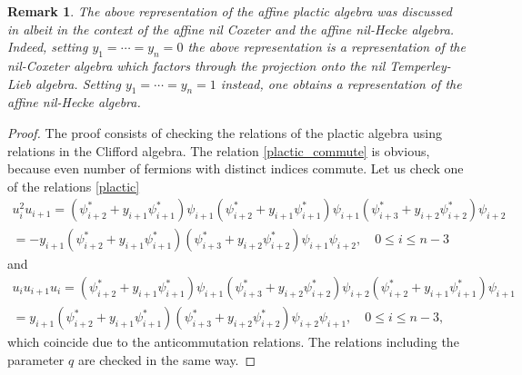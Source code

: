 \documentclass[12pt]{amsart}
\newtheorem{remark}{Remark}[section]
\numberwithin{equation}{section}
\numberwithin{figure}{section}
\begin{document}
    \begin{remark}\rm
        The above representation of the affine plactic algebra was discussed in \cite[Corollary 3.25 and Remark 3.26]{gorbounovkorff2014} albeit in the context of the affine nil Coxeter and the affine nil-Hecke algebra. Indeed, setting $y_1=\cdots=y_n=0$ the above representation is a representation of the nil-Coxeter algebra which factors through the projection onto the nil Temperley-Lieb algebra. Setting $y_1=\cdots=y_n=1$ instead, one obtains a representation of the affine nil-Hecke algebra.
    \end{remark}
    \begin{proof}
        The proof consists of checking the relations of the plactic algebra using relations in the Clifford algebra. The relation \eqref{plactic_commute} is obvious, because even number of fermions with distinct indices commute. Let us check one of the relations \eqref{plactic}
        \begin{gather*}
        u_i^2 u_{i + 1} = (\psi^*_{i + 2} + y_{i + 1} \psi^*_{i + 1}) \psi_{i + 1} (\psi^*_{i + 2} + y_{i + 1} \psi^*_{i + 1}) \psi_{i + 1} (\psi^*_{i + 3} + y_{i + 2} \psi^*_{i + 2}) \psi_{i + 2} \\
        = - y_{i + 1} (\psi^*_{i + 2} + y_{i + 1} \psi^*_{i + 1})(\psi^*_{i + 3} + y_{i + 2} \psi^*_{i + 2})\psi_{i + 1} \psi_{i + 2}, \quad 0 \leq i \leq n - 3 
        \end{gather*}
        and
        \begin{gather*}
            u_i u_{i + 1} u_i = (\psi^*_{i + 2} + y_{i + 1}\psi^*_{i + 1}) \psi_{i + 1}(\psi^*_{i + 3} + y_{i + 2}\psi^*_{i + 2}) \psi_{i + 2}(\psi^*_{i + 2} + y_{i + 1}\psi^*_{i + 1}) \psi_{i + 1} \\
            = y_{i + 1}  (\psi^*_{i + 2} + y_{i + 1} \psi^*_{i + 1})(\psi^*_{i + 3} + y_{i + 2} \psi^*_{i + 2})\psi_{i + 2} \psi_{i + 1}, \quad 0 \leq i \leq n - 3, 
        \end{gather*}
        which coincide due to the anticommutation relations. The relations including the parameter $q$ are checked in the same way.
    \end{proof}
\end{document}

